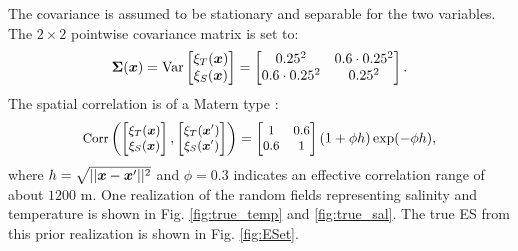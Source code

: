 \documentclass[aoas]{imsart}
\begin{document}
The covariance is assumed to be stationary and separable for the two variables. 
The $2 \times 2$ pointwise covariance matrix is set to:
\begin{equation}\label{v0}
\bSigma(\bx)=\mbox{Var} 
\begin{bmatrix}
    \xi_T(\bx) \\
    \xi_S(\bx) 
    \end{bmatrix}=
\begin{bmatrix}
0.25^2 & 0.6 \cdot 0.25^2 \\
0.6 \cdot 0.25^2 & 0.25^2
\end{bmatrix}.
\end{equation}
The spatial correlation is of a Matern type :
\begin{equation}\label{v}
\small
\mbox{Corr} 
\left(
\begin{bmatrix}
    \xi_T(\bx) \\
    \xi_S(\bx) 
    \end{bmatrix},
    \begin{bmatrix}
    \xi_T(\bx') \\
    \xi_S(\bx') 
    \end{bmatrix}
    \right)
    = \begin{bmatrix}
1 & 0.6  \\
0.6  & 1
\end{bmatrix}(1+\phi h)\exp (-\phi h),
\end{equation}
where $h=\sqrt{||{\boldsymbol x}-{\boldsymbol x}'||^2}$ and $\phi=0.3$ indicates an effective correlation range of about $1200$ m. 
One realization of the random fields representing salinity and
temperature is shown in Fig. \ref{fig:true_temp} and
\ref{fig:true_sal}. The true ES from this prior realization is shown
in Fig. \ref{fig:ESet}.
\end{document}

